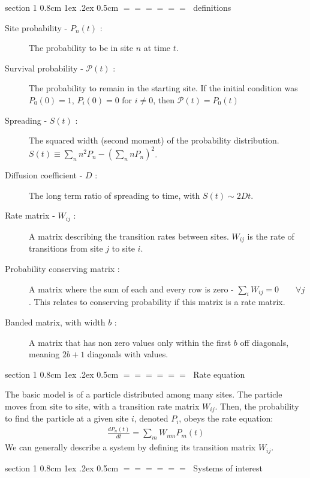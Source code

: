 \documentclass[onecolumn,fleqn,notitlepage,secnumarabic]{revtex4}
\makeatletter
\def\section{%
  \@startsection
    {section}%
    {1}%
    {\z@}%
    {0.8cm \@plus1ex \@minus .2ex}%
    {0.5cm}%
    {\Large\bf $=\!=\!=\!=\!=\!=\;$}%
}%
\makeatother
\begin{document}
\section{definitions}\label{sec:definitions}
\begin{description}
    \item[Site probability - $P_n(t)$ : ] The probability to be in site $n$ at time $t$.
    \item[Survival probability - $\mathcal{P}(t)$ : ] The probability to remain in the starting site. If the initial condition was $P_0(0)=1$, $P_i(0)=0 \textrm{  for  } i\neq 0$, then $\mathcal{P}(t)= P_0(t)$
    \item[Spreading - $S(t)$ : ] The squared width (second moment) of the probability distribution. $S(t) \equiv \sum_n n^2 P_n -\left(\sum_n n P_n\right)^2$. 
    \item[Diffusion coefficient - $D$ : ] The long term ratio of spreading to time, with $S(t) \sim 2Dt$.
    \item[Rate matrix - $W_{ij}$ : ] A matrix describing the transition rates between sites. $W_{ij}$ is the rate of transitions from site $j$ to site $i$.
    \item[Probability conserving matrix : ]\label{def:prob_conserv} A matrix where the sum of each and every row is zero - $\sum_i W_{ij} = 0 \qquad \forall j$. This relates to conserving probability if this matrix is a rate matrix.
    \item[Banded matrix, with width $b$ : ] A matrix that has non zero values only within the first $b$ off diagonals, meaning $2b+1$ diagonals with values.
\end{description}


\section{Rate equation}

The basic model is of a particle distributed among many sites. The particle moves from site to site, with a transition rate matrix $W_{ij}$. Then, the probability to find the particle at a given site $i$, denoted $P_i$, obeys the rate equation:
\begin{align}
\frac{dP_n(t)}{dt} = \sum_m W_{nm}P_m(t)
\end{align}
We can generally describe a system by defining its transition matrix $W_{ij}$.

\section{Systems of interest}\label{sec:sys_of_interest}
\end{document}
